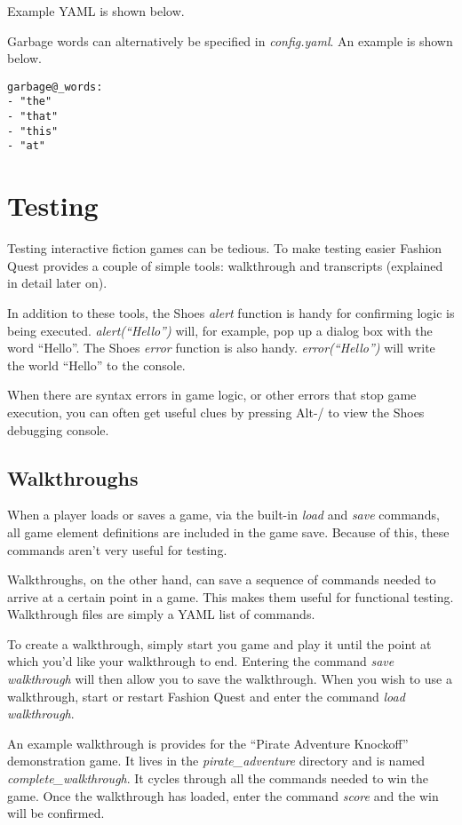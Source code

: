 \documentclass[letterpaper,10pt,english]{sphinxmanual}
\begin{document}
Example YAML is shown below.

Garbage words can alternatively be specified in \emph{config.yaml}. An example is shown below.

\begin{Verbatim}[commandchars=@\[\]]
garbage@_words:
- "the"
- "that"
- "this"
- "at"
\end{Verbatim}


\section{Testing}
\label{fine_tuning:testing}
Testing interactive fiction games can be tedious. To make testing easier Fashion Quest provides a couple of simple tools: walkthrough and transcripts (explained in detail later on).

In addition to these tools, the Shoes \emph{alert} function is handy for confirming logic is being executed. \emph{alert(``Hello'')} will, for example, pop up a dialog box with the word ``Hello''. The Shoes \emph{error} function is also handy. \emph{error(``Hello'')} will write the world ``Hello'' to the console.

When there are syntax errors in game logic, or other errors that stop game execution, you can often get useful clues by pressing Alt-/ to view the Shoes debugging console.


\subsection{Walkthroughs}
\label{fine_tuning:walkthroughs}
When a player loads or saves a game, via the built-in \emph{load} and \emph{save} commands, all game element definitions are included in the game save. Because of this, these commands aren't very useful for testing.

Walkthroughs, on the other hand, can save a sequence of commands needed to arrive at a certain point in a game. This makes them useful for functional testing. Walkthrough files are simply a YAML list of commands.

To create a walkthrough, simply start you game and play it until the point at which you'd like your walkthrough to end. Entering the command \emph{save walkthrough} will then allow you to save the walkthrough. When you wish to use a walkthrough, start or restart Fashion Quest and enter the command \emph{load walkthrough}.

An example walkthrough is provides for the ``Pirate Adventure Knockoff'' demonstration game. It lives in the \emph{pirate\_adventure} directory and is named \emph{complete\_walkthrough}. It cycles through all the commands needed to win the game. Once the walkthrough has loaded, enter the command \emph{score} and the win will be confirmed.
\end{document}
